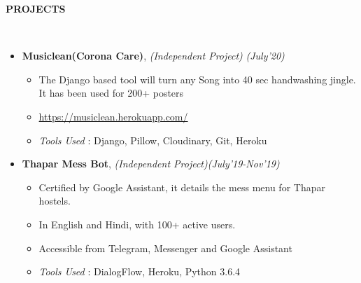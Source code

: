 \documentclass[a4paper,10pt]{article}
\newcommand{\resheading}[1]{{\small \colorbox{mygrey}{\begin{minipage}{0.99\textwidth}{\textbf{#1 \vphantom{p\^{E}}}}\end{minipage}}}}
\begin{document}
\noindent
\resheading{\textbf{PROJECTS} }\\[-0.2cm]
\begin{itemize}[noitemsep,nolistsep]
\item \textbf{Musiclean(Corona Care)}, \emph{(Independent Project)}
\hfill \emph{(July’20)} \\[-0.4cm]
\begin{itemize}[noitemsep,nolistsep]
    \item The Django based tool will turn any Song into 40 sec handwashing jingle. It has been used for 200+ posters
    \item \url{https://musiclean.herokuapp.com/}
    \item \emph{Tools Used} : Django, Pillow, Cloudinary, Git, Heroku \\[-0.4cm]
\end{itemize}
    
\item \textbf{Thapar Mess Bot}, \emph{(Independent Project)}\hfill \emph{(July’19-Nov'19)} \\[-0.4cm]
\begin{itemize}[noitemsep,nolistsep]
    \item Certified by Google Assistant, it details the mess menu for Thapar hostels.
    \item In English and Hindi, with 100+ active users.
    \item Accessible from Telegram, Messenger and Google Assistant
    \item \emph{Tools Used} : DialogFlow, Heroku, Python 3.6.4 \\[-0.2cm]
\end{itemize}

\end{itemize}
\end{document}
